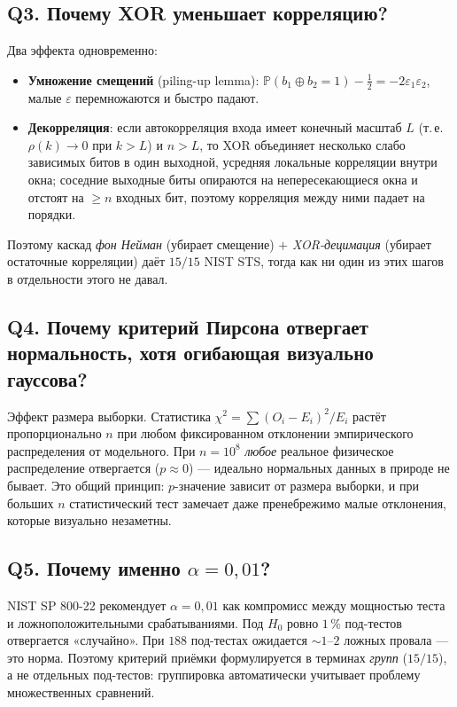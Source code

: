 \documentclass[12pt,a4paper]{extarticle}
\begin{document}
\subsection*{Q3. Почему XOR уменьшает корреляцию?}
Два эффекта одновременно:
\begin{itemize}
  \item \textbf{Умножение смещений} (piling-up lemma):
        $\mathbb{P}(b_1\oplus b_2=1) - \tfrac12 = -2\varepsilon_1\varepsilon_2$,
        малые $\varepsilon$ перемножаются и быстро падают.
  \item \textbf{Декорреляция}: если автокорреляция входа имеет конечный масштаб $L$
        (т.\,е. $\rho(k)\to 0$ при $k>L$) и $n>L$, то XOR объединяет несколько слабо
        зависимых битов в один выходной, усредняя локальные корреляции внутри окна;
        соседние выходные биты опираются на непересекающиеся окна и отстоят на
        $\ge n$ входных бит, поэтому корреляция между ними падает на порядки.
\end{itemize}
Поэтому каскад \emph{фон Нейман} (убирает смещение) $+$ \emph{XOR-децимация} (убирает остаточные
корреляции) даёт $15/15$ NIST STS, тогда как ни один из этих шагов в отдельности этого не давал.

\subsection*{Q4. Почему критерий Пирсона отвергает нормальность, хотя огибающая визуально гауссова?}
Эффект размера выборки. Статистика
$\chi^2 = \sum (O_i - E_i)^2 / E_i$ растёт пропорционально $n$ при любом фиксированном
отклонении эмпирического распределения от модельного. При $n = 10^8$ \emph{любое} реальное
физическое распределение отвергается ($p\!\approx\!0$) --- идеально нормальных данных
в природе не бывает. Это общий принцип: $p$-значение зависит от размера выборки, и при
больших $n$ статистический тест замечает даже пренебрежимо малые отклонения, которые
визуально незаметны.

\subsection*{Q5. Почему именно $\alpha=0{,}01$?}
NIST SP 800-22 рекомендует $\alpha=0{,}01$ как компромисс между мощностью теста и
ложноположительными срабатываниями. Под $H_0$ ровно $1\,\%$ под-тестов отвергается
«случайно». При $188$ под-тестах ожидается $\sim 1$--$2$ ложных провала --- это норма.
Поэтому критерий приёмки формулируется в терминах \emph{групп} ($15/15$), а не отдельных
под-тестов: группировка автоматически учитывает проблему множественных сравнений.
\end{document}

